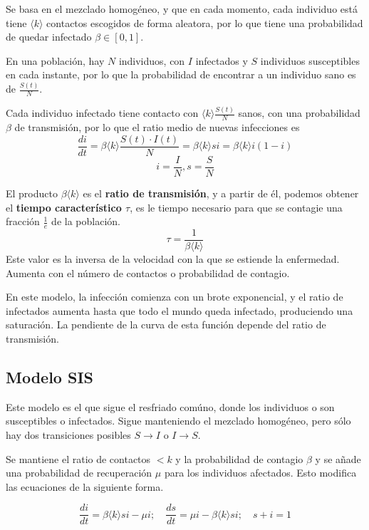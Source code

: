 \documentclass[10pt,spanish, landscape, twocolumn]{article}
\begin{document}
Se basa en el mezclado homogéneo, y que en cada momento, cada individuo está tiene $\langle k \rangle$ contactos escogidos de forma aleatora, por lo que tiene una probabilidad de quedar infectado $\beta \in [0,1]$.

En una población, hay $N$ individuos, con $I$ infectados y $S$ individuos susceptibles en cada instante, por lo que la probabilidad de encontrar a un individuo sano es de $\frac{S(t)}{N}$. 

Cada individuo infectado tiene contacto con $\langle k \rangle\frac{S(t)}{N}$ sanos, con una probabilidad $\beta$ de transmisión, por lo que el ratio medio de nuevas infecciones es $$\frac{di}{dt} = \beta \langle k \rangle \frac{S(t)\cdot I(t)}{N} = \beta \langle k \rangle si = \beta \langle k \rangle i(1-i)$$$$ i = \frac{I}{N}, s = \frac{S}{N}$$

El producto $\beta \langle k \rangle$ es el \textbf{\textcolor{temasiete}{ratio de transmisión}}, y a partir de él, podemos obtener el \textbf{\textcolor{temasiete}{tiempo característico $\tau$}}, es le tiempo necesario para que se contagie una fracción $\frac{1}{e}$ de la población. $$\tau = \frac{1}{\beta\langle k \rangle}$$
Este valor es la inversa de la velocidad con la que se estiende la enfermedad. Aumenta con el número de contactos o probabilidad de contagio.

En este modelo, la infección comienza con un brote exponencial, y el ratio de infectados aumenta hasta que todo el mundo queda infectado, produciendo una saturación. La pendiente de la curva de esta función depende del ratio de transmisión.

\subsection{\textcolor{temasiete}Modelo SIS}

Este modelo es el que sigue el resfriado comúno, donde los individuos o son susceptibles o infectados. Sigue manteniendo el mezclado homogéneo, pero sólo hay dos transiciones posibles $S\rightarrow I$ o $I \rightarrow S$.

Se mantiene el ratio de contactos $<k$ y la probabilidad de contagio $\beta$ y se añade una probabilidad de recuperación $\mu$ para los individuos afectados. Esto modifica las ecuaciones de la siguiente forma. 

$$\frac{di}{dt} =  \beta \langle k \rangle si - \mu i; \quad \frac{ds}{dt} = \mu i - \beta \langle k \rangle si; \quad s + i = 1$$
\end{document}
